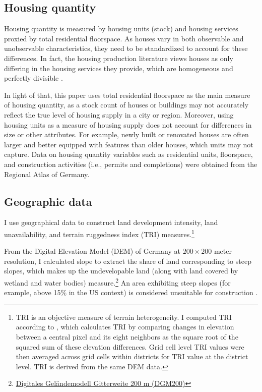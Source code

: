 \documentclass[
  12pt,
]{article}
\begin{document}
\subsection{Housing quantity}\label{housing-quantity}

Housing quantity is measured by housing units (stock) and housing services proxied by total residential floorspace. As houses vary in both observable and unobservable characteristics, they need to be standardized to account for these differences. In fact, the housing production literature views houses as only differing in the housing services they provide, which are homogeneous and perfectly divisible \citep{epple-etal2010, combes-etal2021}.

In light of that, this paper uses total residential floorspace as the main measure of housing quantity, as a stock count of houses or buildings may not accurately reflect the true level of housing supply in a city or region. Moreover, using housing units as a measure of housing supply does not account for differences in size or other attributes. For example, newly built or renovated houses are often larger and better equipped with features than older houses, which units may not capture. Data on housing quantity variables such as residential units, floorspace, and construction activities (i.e., permits and completions) were obtained from the Regional Atlas of Germany.

\subsection{Geographic data}\label{geographic-data}

I use geographical data to construct land development intensity, land unavailability, and terrain ruggedness index (TRI) measures.\footnote{TRI is an objective measure of terrain heterogeneity. I computed TRI according to \citet{riley-etal1999}, which calculates TRI by comparing changes in elevation between a central pixel and its eight neighbors as the square root of the squared sum of these elevation differences. Grid cell level TRI values were then averaged across grid cells within districts for TRI value at the district level. TRI is derived from the same DEM data.}

From the Digital Elevation Model (DEM) of Germany at \(200\times200\) meter resolution, I calculated slope to extract the share of land corresponding to steep slopes, which makes up the undevelopable land (along with land covered by wetland and water bodies) measure.\footnote{\href{https://gdz.bkg.bund.de/index.php/default/digitale-geodaten/digitale-gelandemodelle/digitales-gelandemodell-gitterweite-200-m-dgm200.html}{Digitales Geländemodell Gitterweite 200 m (DGM200)}} An area exhibiting steep slopes (for example, above 15\% in the US context) is considered unsuitable for construction \citep{saiz2010}.
\end{document}
